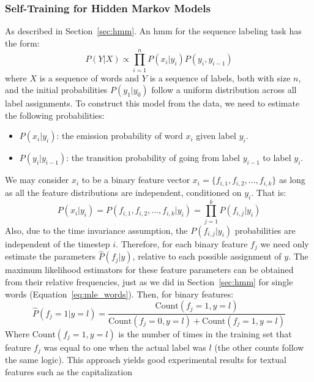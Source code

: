 \documentclass{nle}
\begin{document}
\subsubsection{Self-Training for Hidden Markov Models} 
\label{sssec:self_training}

As described in Section~\ref{sec:hmm}. An \gls{hmm} for the sequence labeling task 
has the form:
\begin{equation}
P(Y|X) \propto \prod_{i=1}^n P(x_i|y_i) P(y_i, y_{i-1})
\end{equation}
where $ X $ is a sequence of words and $ Y $ is a sequence of labels, both with size $ n $,
and the initial probabilities $ P(y_1|y_0) $ follow a uniform distribution across all label 
assignments.
To construct this model from the data, we need to estimate the following probabilities:
%
\begin{itemize}
  \item $ P(x_i|y_i) $: the emission probability of word $ x_i $ given label $ y_i $.
  \item $ P(y_i|y_{i-1}) $: the transition probability of going from label $ y_{i-1} $ to label $ y_i $.
\end{itemize}
%
We may consider $ x_i $ to be a binary feature vector $ x_i = \{ f_{i,1}, f_{i,2}, ..., f_{i,k} \} $
as long as all the feature distributions are independent, conditioned on $ y_i $. That is:
\begin{equation}
P(x_i|y_i) = P(f_{i,1}, f_{i,2}, ..., f_{i,k}|y_i) = \prod_{j=1}^k P(f_{i,j}|y_i)
\end{equation}
%
Also, due to the time invariance assumption, the $ P(f_{i,j}|y_i) $ probabilities 
are independent of the timestep $ i $. Therefore, for each binary feature $ f_j $ we
need only estimate the parameters $ \hat{P}(f_{j}|y) $, relative to each possible
assignment of $ y $.
The maximum likelihood estimators for these feature parameters can be obtained
from their relative frequencies, just as we did in Section~\ref{sec:hmm} for single words 
(Equation~\ref{eq:mle_words}). Then, for binary features:
%
\begin{equation}
\hat{P}(f_{j}=1|y=l) = \frac{\text{Count}(f_{j}=1, y=l)}
{\text{Count}(f_{j}=0, y=l) + \text{Count}(f_{j}=1, y=l)}
\label{eq:feature_mle}
\end{equation}
%
Where $ \text{Count}(f_{j}=1, y=l) $ is the number of times in the training set that
feature $ f_j $ was equal to one when the actual label was $ l $ (the other counts follow the same logic).
This approach yields good experimental results for textual features such as the capitalization
\end{document}
